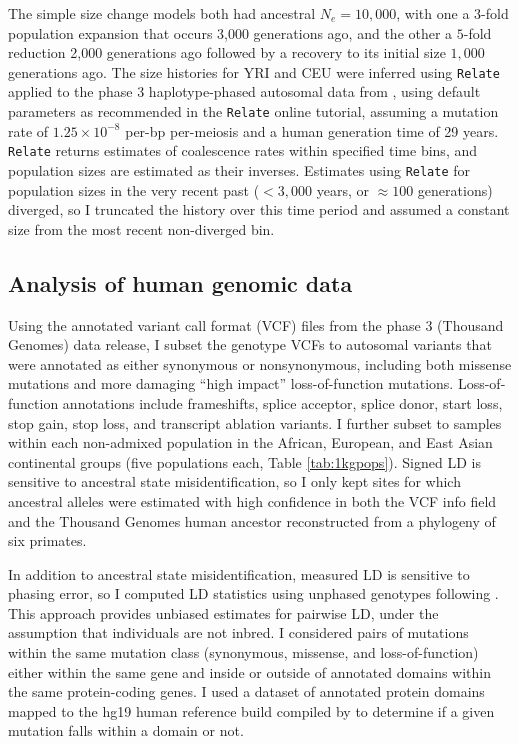\documentclass[]{article}
\begin{document}
The simple size change models both had ancestral \(N_e=10,000\), with one a
\(3\)-fold population expansion that occurs 3,000 generations ago, and the
other a \(5\)-fold reduction 2,000 generations ago followed by a recovery to
its initial size \(1,000\) generations ago. The size histories for YRI and CEU
were inferred using \texttt{Relate} \citep{Speidel2019-nj} applied to the phase
3 haplotype-phased autosomal data from
\citet{1000_Genomes_Project_Consortium2015-zq}, using default parameters as
recommended in the \texttt{Relate} online tutorial, assuming a mutation rate of
\(1.25\times10^{-8}\) per-bp per-meiosis and a human generation time of 29
years. \texttt{Relate} returns estimates of coalescence rates within specified
time bins, and population sizes are estimated as their inverses. Estimates
using \texttt{Relate} for population sizes in the very recent past (\(<3,000\)
years, or \(\approx 100\) generations) diverged, so I truncated the history
over this time period and assumed a constant size from the most recent
non-diverged bin.

\subsection{Analysis of human genomic data}
\label{analysis-of-human-genomic-data}

Using the annotated variant call format (VCF) files from the phase 3
\citet{1000_Genomes_Project_Consortium2015-zq} (Thousand Genomes) data release,
I subset the genotype VCFs to autosomal variants that were annotated as either
synonymous or nonsynonymous, including both missense mutations and more
damaging ``high impact'' loss-of-function mutations. Loss-of-function
annotations include frameshifts, splice acceptor, splice donor, start loss,
stop gain, stop loss, and transcript ablation variants. I further subset to
samples within each non-admixed population in the African, European, and East
Asian continental groups (five populations each, Table \ref{tab:1kgpops}).
Signed LD is sensitive to ancestral state misidentification, so I only kept
sites for which ancestral alleles were estimated with high confidence in both
the VCF info field and the Thousand Genomes human ancestor reconstructed from a
phylogeny of six primates.

In addition to ancestral state misidentification, measured LD is sensitive to
phasing error, so I computed LD statistics using unphased genotypes following
\citet{Ragsdale2020-nz}. This approach provides unbiased estimates for pairwise
LD, under the assumption that individuals are not inbred. I considered pairs of
mutations within the same mutation class (synonymous, missense, and
loss-of-function) either within the same gene and inside or outside of
annotated domains within the same protein-coding genes. I used a dataset of
annotated protein domains mapped to the hg19 human reference build compiled by
\citet{Stanek2020-pa} to determine if a given mutation falls within a domain or
not.
\end{document}

